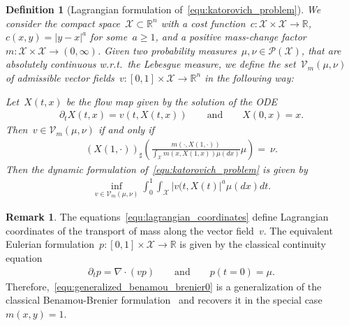 \documentclass{article}
\newtheorem{definition}[theorem]{Definition}
\theoremstyle{definition}
\newtheorem{remark}[theorem]{Remark}
\begin{document}
\begin{definition}[Lagrangian formulation of~\eqref{equ:katorovich_problem}] \label{pro:lagrangian_NCOT}
  We consider the compact space~$\mathcal{X} \subset \mathbb{R}^n$ with a cost function~$c: \mathcal{X} \times \mathcal{X} \to \mathbb{R}$, $c(x,y)= |y-x|^a$ for some~$a\geq 1$, and a positive mass-change factor~$m: \mathcal{X} \times \mathcal{X} \to (0, \infty)$. Given two probability measures~$\mu, \nu \in \mathcal{P}(\mathcal{X})$, that are absolutely continuous w.r.t.~the Lebesgue measure, we define the set~$\mathcal{V}_m(\mu, \nu)$ of admissible vector fields~$v: [0,1] \times \mathcal{X} \to \mathbb{R}^n$ in the following way:\smallskip

  Let~$X(t, x)$ be the flow map given by the solution of the ODE
  \begin{align}\label{equ:lagrangian_coordinates}
      \partial_t X(t, x) = v(t, X(t, x)) \qquad \mbox{and} \qquad X(0,x)=x.
  \end{align}
  Then~$v \in \mathcal{V}_{m}(\mu, \nu)$ if and only if
  \begin{align}\label{equ:admissible_vector_field}
      \left( X(1, \cdot) \right)_{\sharp} \left( \frac{m(\cdot,X(1,\cdot))}{\int_\mathcal{X} m(x ,X(1,x)) \mu(dx)} \mu \right) =  \ \nu.
  \end{align}
    Then the dynamic formulation of~\eqref{equ:katorovich_problem} is given by
    \begin{align}\label{equ:generalized_benamou_brenier0} \tag{GBB}
        \inf_{v \in \mathcal{V}_m(\mu, \nu)} \int_{0}^1 \int_{\mathcal{X}} |v(t, X(t)|^a \mu(dx) dt.
    \end{align}
\end{definition}

\begin{remark}\label{rem:eulerian_formulation}
    The equations~\eqref{equ:lagrangian_coordinates} define Lagrangian coordinates of the transport of mass along the vector field~$v$. The equivalent Eulerian formulation~$p:[0,1] \times \mathcal{X} \to \mathbb{R}$ is given by the classical continuity equation 
    \begin{align}\label{equ:continuity_equation}
        \partial_t p = \nabla \cdot (v p) \qquad \mbox{and} \qquad p(t=0)= \mu.
    \end{align}
    Therefore,~\eqref{equ:generalized_benamou_brenier0} is a generalization of the classical Benamou-Brenier formulation~\cite{benamou2000computational} and recovers it in the special case~$m(x,y)=1$.
\end{remark}
\end{document}
